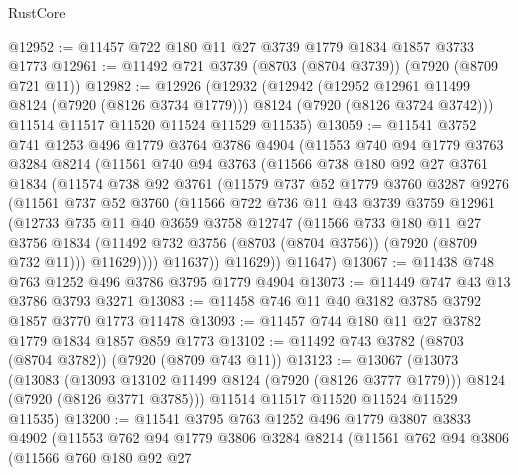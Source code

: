 \begin{lexlean}{RustCore}
\begin{coremodule}
@12952 := @11457 @722 @180 @11 @27 @3739 @1779 @1834 @1857 @3733 @1773
@12961 := @11492 @721 @3739 (@8703 (@8704 @3739)) (@7920 (@8709 @721 @11))
@12982 := @12926
    (@12932
      (@12942
        (@12952 @12961 @11499 @8124 (@7920 (@8126 @3734 @1779)))
        @8124
        (@7920 (@8126 @3724 @3742)))
      @11514
      @11517
      @11520
      @11524
      @11529
      @11535)
@13059 := @11541
    @3752
    @741
    @1253
    @496
    @1779
    @3764
    @3786
    @4904
    (@11553
      @740
      @94
      @1779
      @3763
      @3284
      @8214
      (@11561
        @740
        @94
        @3763
        (@11566
          @738
          @180
          @92
          @27
          @3761
          @1834
          (@11574
            @738
            @92
            @3761
            (@11579
              @737
              @52
              @1779
              @3760
              @3287
              @9276
              (@11561
                @737
                @52
                @3760
                (@11566
                  @722
                  @736
                  @11
                  @43
                  @3739
                  @3759
                  @12961
                  (@12733
                    @735
                    @11
                    @40
                    @3659
                    @3758
                    @12747
                    (@11566
                      @733
                      @180
                      @11
                      @27
                      @3756
                      @1834
                      (@11492 @732 @3756 (@8703 (@8704 @3756)) (@7920 (@8709 @732 @11)))
                      @11629))))
              @11637))
          @11629))
      @11647)
@13067 := @11438 @748 @763 @1252 @496 @3786 @3795 @1779 @4904
@13073 := @11449 @747 @43 @13 @3786 @3793 @3271
@13083 := @11458 @746 @11 @40 @3182 @3785 @3792 @1857 @3770 @1773 @11478
@13093 := @11457 @744 @180 @11 @27 @3782 @1779 @1834 @1857 @859 @1773
@13102 := @11492 @743 @3782 (@8703 (@8704 @3782)) (@7920 (@8709 @743 @11))
@13123 := @13067
    (@13073
      (@13083
        (@13093 @13102 @11499 @8124 (@7920 (@8126 @3777 @1779)))
        @8124
        (@7920 (@8126 @3771 @3785)))
      @11514
      @11517
      @11520
      @11524
      @11529
      @11535)
@13200 := @11541
    @3795
    @763
    @1252
    @496
    @1779
    @3807
    @3833
    @4902
    (@11553
      @762
      @94
      @1779
      @3806
      @3284
      @8214
      (@11561
        @762
        @94
        @3806
        (@11566
          @760
          @180
          @92
          @27

\end{coremodule}
\end{lexlean}
